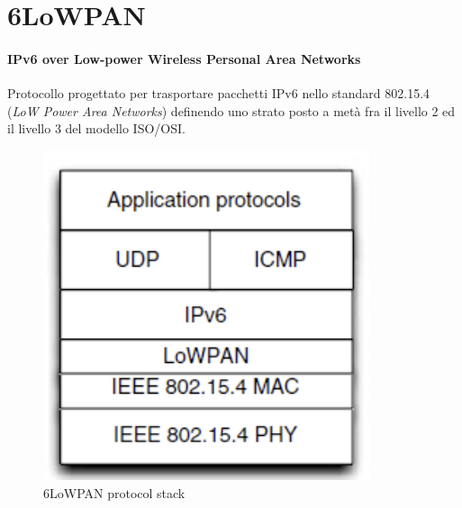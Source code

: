\documentclass{article}
\begin{document}
\newpage
\section{6LoWPAN}
\paragraph{IPv6 over Low-power Wireless Personal Area Networks}
Protocollo progettato per trasportare pacchetti IPv6 nello standard 802.15.4 (\textit{LoW Power Area Networks}) definendo uno strato posto a metà fra il livello 2 ed il livello 3 del modello ISO/OSI.
\begin{figure}[H]
\centering
\includegraphics[scale=0.6]{figures/6LoWPAN stack.png}
\caption{6LoWPAN protocol stack}
\end{figure}
\end{document}
